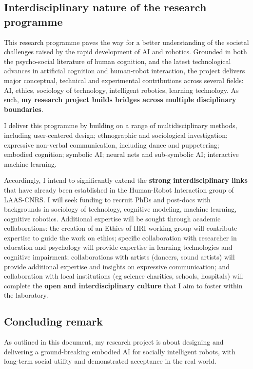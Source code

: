 \subsection{Interdisciplinary nature of the research programme}

This research programme paves the way for a better understanding of the societal
challenges raised by the rapid development of AI and robotics. Grounded in both
the psycho-social literature of human cognition, and the latest technological
advances in artificial cognition and human-robot interaction, the project
delivers major conceptual, technical and experimental contributions across
several fields: AI, ethics, sociology of technology, intelligent robotics,
learning technology. As such, \textbf{my research project builds bridges across
multiple disciplinary boundaries}.

I deliver this programme by building on a range of multidisciplinary methods,
including user-centered design; ethnographic and sociological investigation;
expressive non-verbal communication, including dance and puppetering; embodied
cognition; symbolic AI; neural nets and sub-symbolic AI; interactive machine
learning.

Accordingly, I intend to significantly extend the \textbf{strong
interdisciplinary links} that have already been established in the Human-Robot
Interaction group of LAAS-CNRS. I will seek funding to recruit PhDs and
post-docs with backgrounds in sociology of technology, cognitive modeling,
machine learning, cognitive robotics. Additional expertise will be sought
through academic collaborations: the creation of an Ethics of HRI working group
will contribute expertise to guide the work on ethics; specific collaboration
with researcher in education and psychology will provide expertise in learning
technologies and cognitive impairment; collaborations with artists (dancers,
sound artists) will provide additional expertise and insights on expressive
communication; and collaboration with local institutions (eg science charities,
schools, hospitals) will complete the \textbf{open and interdisciplinary
culture} that I aim to foster within the laboratory.


\subsection{Concluding remark}


As outlined in this document, my research project is about designing and
delivering a ground-breaking embodied AI for socially intelligent robots, with
long-term social utility and demonstrated acceptance in the real world.


